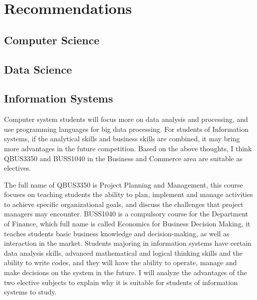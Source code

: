 \documentclass[12pt]{article}
\begin{document}
\newpage
\section{Recommendations}

\subsection{Computer Science}

\newpage
\subsection{Data Science}

\newpage
\subsection{Information Systems}

Computer system students will focus more on data analysis and processing, and use programming languages for big data processing. For students of Information systems, if the analytical skills and business skills are combined, it may bring more advantages in the future competition. Based on the above thoughts, I think QBUS3350 and BUSS1040 in the Business and Commerce area are suitable as electives.

The full name of QBUS3350 is Project Planning and Management, this course focuses on teaching students the ability to plan, implement and manage activities to achieve specific organizational goals, and discuss the challenges that project managers may encounter. BUSS1040 is a compulsory course for the Department of Finance, which full name is called Economics for Business Decision Making, it teaches students basic business knowledge and decision-making, as well as interaction in the market. Students majoring in information systems have certain data analysis skills, advanced mathematical and logical thinking skills and the ability to write codes, and they will have the ability to operate, manage and make decisions on the system in the future. I will analyze the advantages of the two elective subjects to explain why it is suitable for students of information systems to study.
\end{document}
